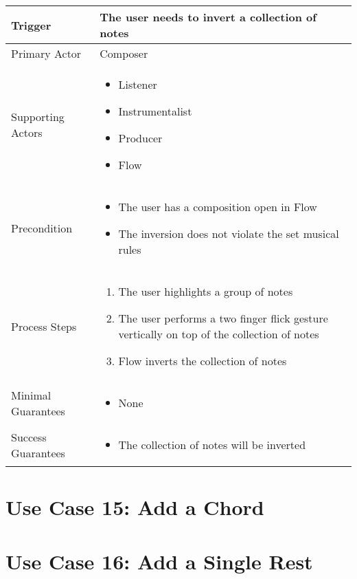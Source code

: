   \begin{tabularx}{\textwidth}{|X|X|}
  \hline
  Trigger & 
  The user needs to invert a collection of notes \\
  \hline
  Primary Actor & 
  Composer \\
  \hline
  Supporting Actors & 
  \begin{itemize}
  \item Listener
  \item Instrumentalist
  \item Producer
  \item Flow
  \end{itemize} \\
  \hline
  Precondition & 
  \begin{itemize}
  \item The user has a composition open in Flow
  \item The inversion does not violate the set musical rules
  \end{itemize} \\
  \hline
  Process Steps & 
  \begin{enumerate}
  \item The user highlights a group of notes
  \item The user performs a two finger flick gesture vertically on top of the collection of notes
  \item Flow inverts the collection of notes
  \end{enumerate} \\
  \hline
  Minimal Guarantees & 
  \begin{itemize}
    \item None
  \end{itemize} \\
  \hline
  Success Guarantees & 
  \begin{itemize}
    \item The collection of notes will be inverted
  \end{itemize} \\
  \hline
  \end{tabularx}

  \section{Use Case 15: Add a Chord}


  \section{Use Case 16: Add a Single Rest}

